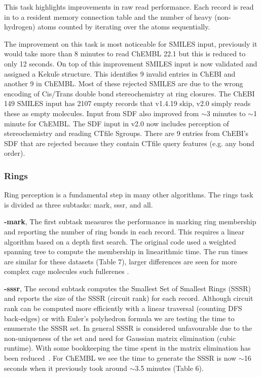 \documentclass[doublespacing]{bmcart}
\def \cdkversion {v2.0}
\begin{document}
This task highlights improvements in raw read performance. Each record is read
in to a resident memory connection table and the number of heavy (non-hydrogen)
atoms counted by iterating over the atoms sequentially.

The improvement on this task is most noticeable for SMILES input, previously
it would take more than 8 minutes to read ChEMBL 22.1 but this is reduced
to only 12 seconds. On top of this improvement SMILES input is now validated 
and assigned a Kekul$\mathrm{\acute{e}}$ structure. This identifies 9 invalid
entries in ChEBI and another 9 in ChEMBL. Most of these rejected SMILES
are due to the wrong encoding of Cis/Trans double bond stereochemistry at ring 
closures. The ChEBI 149 SMILES input has 2107 empty records that v1.4.19 skip,
\cdkversion{} simply reads these as empty molecules. Input from SDF also 
improved from $\sim$3 minutes to $\sim$1 minute for ChEMBL. The SDF input in
\cdkversion{} now includes perception of stereochemistry and reading CTfile 
Sgroups. There are 9 entries from ChEBI's SDF that are rejected because they 
contain CTfile query features (e.g. any bond order).

\subsubsection*{Rings}

Ring perception is a fundamental step in many other algorithms. 
The rings task is divided as three subtasks: mark, sssr, and all.

\textbf{-mark}, The first subtask measures the performance in marking 
ring membership and reporting the number of ring bonds in each record.
This requires a linear algorithm based on a depth first search. 
The original code used a weighted spanning tree to compute the membership in 
linearithmic time. The run times are similar for these datasets (Table
7), larger differences are seen for more complex cage molecules such fullerenes
\cite{May2014}.

\textbf{-sssr}, The second subtask computes the Smallest Set of Smallest Rings 
(SSSR) and reports the size of the SSSR (circuit rank) for each record. Although 
circuit rank can be computed more efficiently 
with a linear traversal (counting DFS back-edges) or with Euler's 
polyhedron formula we are testing the time to enumerate the SSSR set. In general
SSSR is considered unfavourable due to the 
non-uniqueness of the set and need for Gaussian matrix elimination (cubic 
runtime). With some bookkeeping the time spent in the matrix elimination has been
reduced~\cite{May2014}. For ChEMBL we see the time to generate the SSSR is now
$\sim$16 seconds when it previously took around $\sim$3.5 minutes (Table 6).
\end{document}
